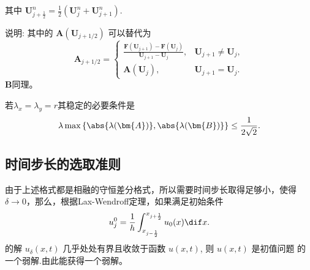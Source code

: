 \documentclass[12pt]{article}
\begin{document}
其中 $\bm{U}_{j+\frac{1}{2}}^{n}=\frac{1}{2}\left(\bm{U}_{j}^{n}+\bm{U}_{j+1}^{n}\right)$.

说明: 其中的 $\bm{A}\left(\bm{U}_{j+1 / 2}\right)$ 可以替代为
\begin{equation}
	\bm{A}_{j+1 / 2}=\left\{
		\begin{array}{ll}
		\frac{\bm{F}\left(\bm{U}_{j+1}\right)-\bm{F}\left(\bm{U}_{j}\right)}{\bm{U}_{j+1}-\bm{U}_{j}}, & \bm{U}_{j+1} \neq \bm{U}_{j}, \\
		\bm{A}\left(\bm{U}_{j}\right), & \bm{U}_{j+1}=\bm{U}_{j}.
		\end{array}\right.
\end{equation}
$\bm{B}$同理。

若$\lambda_x=\lambda_y=r$其稳定的必要条件是
\begin{equation}
	\lambda \max{\left\{\abs{\lambda(\bm{A})},\abs{\lambda(\bm{B})}\right\}} \leq \frac{1}{2\sqrt{2}}.
\end{equation}

\subsection{时间步长的选取准则}


由于上述格式都是相融的守恒差分格式，所以需要时间步长取得足够小，使得$\delta \to 0$，那么，根据Lax-Wendroff定理，如果满足初始条件
\begin{equation}
	u_{j}^{0}=\frac{1}{h} \int_{x_{j-\frac{1}{2}}}^{x_{j+\frac{1}{2}}} u_{0}(x) \dif x.
\end{equation}
的解 $u_{\delta}(x, t)$ 几乎处处有界且收敛于函数 $u(x, t)$, 则 $u(x, t)$ 是初值问题 的 一个弱解.由此能获得一个弱解。






















\end{document}

